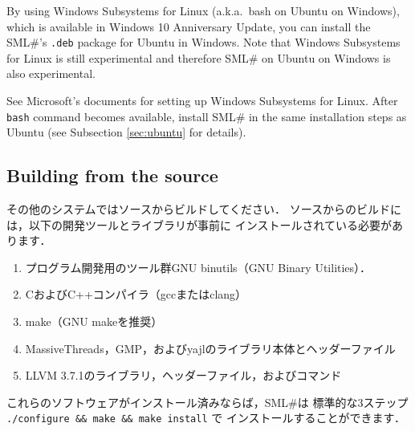 \documentclass{jbook}
\newcommand{\txt}[2]{#2}
\newcommand{\smlsharp}{SML\#}
\begin{document}

\else%
	By using Windows Subsystems for Linux
(a.k.a.~bash on Ubuntu on Windows),
which is available in Windows 10 Anniversary Update,
you can install the \smlsharp{}'s {\tt .deb} package for Ubuntu in Windows.
	Note that Windows Subsystems for Linux is still experimental
and therefore \smlsharp{} on Ubuntu on Windows is also experimental.

	See Microsoft's documents for setting up Windows Subsystems for Linux.
	After {\tt bash} command becomes available,
install \smlsharp{} in the same installation steps as Ubuntu
(see Subsection \ref{sec:ubuntu} for details).

\fi%


\subsection{\txt{ソースからビルドする場合}{Building from the source}}
\ifjp%
	その他のシステムではソースからビルドしてください．
	ソースからのビルドには，以下の開発ツールとライブラリが事前に
インストールされている必要があります．
\begin{enumerate}
\item プログラム開発用のツール群GNU binutils（GNU Binary Utilities）．
\item CおよびC++コンパイラ（gccまたはclang）
\item make（GNU makeを推奨）
\item MassiveThreads，GMP，およびyajlのライブラリ本体とヘッダーファイル
\item LLVM 3.7.1のライブラリ，ヘッダーファイル，およびコマンド
\end{enumerate}
	これらのソフトウェアがインストール済みならば，\smlsharp{}は
標準的な3ステップ {\tt ./configure \&\& make \&\& make install} で
インストールすることができます．
\end{document}
